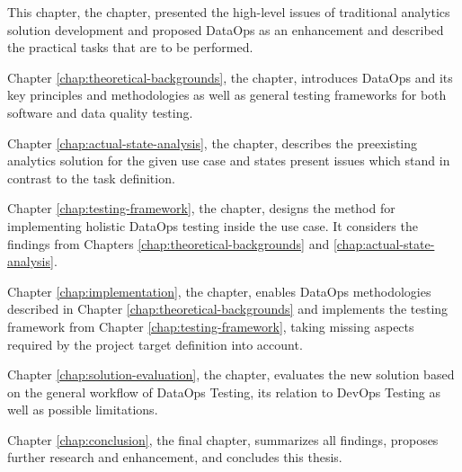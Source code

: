 This chapter, the  chapter, presented the high-level issues of traditional analytics solution development and proposed DataOps as an enhancement and described the practical tasks that are to be performed.

Chapter \ref{chap:theoretical-backgrounds}, the  chapter, introduces DataOps and its key principles and methodologies as well as general testing frameworks for both software and data quality testing.

Chapter \ref{chap:actual-state-analysis}, the  chapter, describes the preexisting analytics solution for the given use case and states present issues which stand in contrast to the task definition.

Chapter \ref{chap:testing-framework}, the  chapter, designs the method for implementing holistic DataOps testing inside the use case. It considers the findings from Chapters \ref{chap:theoretical-backgrounds} and \ref{chap:actual-state-analysis}.

Chapter \ref{chap:implementation}, the  chapter, enables DataOps methodologies described in Chapter \ref{chap:theoretical-backgrounds} and implements the testing framework from Chapter \ref{chap:testing-framework}, taking missing aspects required by the project target definition into account.

Chapter \ref{chap:solution-evaluation}, the  chapter, evaluates the new solution based on the general workflow of DataOps Testing, its relation to DevOps Testing as well as possible limitations.

Chapter \ref{chap:conclusion}, the final  chapter, summarizes all findings, proposes further research and enhancement, and concludes this thesis.
